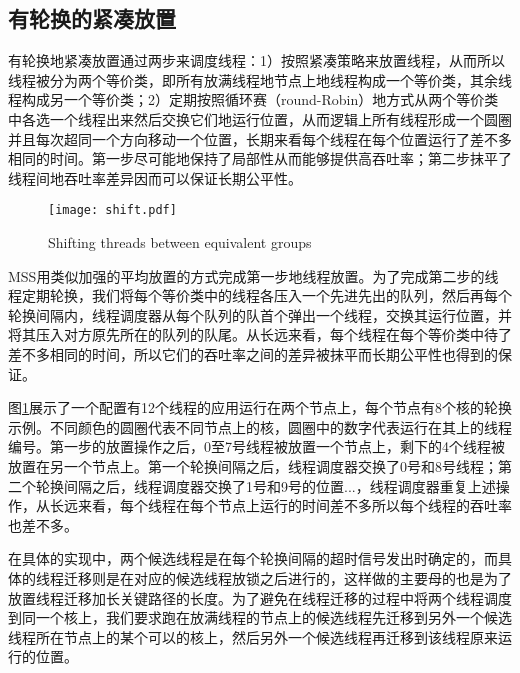 \subsection{有轮换的紧凑放置}
有轮换地紧凑放置通过两步来调度线程：1）按照紧凑策略来放置线程，从而所以线程被分为两个等价类，即所有放满线程地节点上地线程构成一个等价类，其余线程构成另一个等价类；2）定期按照循环赛（round-Robin）地方式从两个等价类中各选一个线程出来然后交换它们地运行位置，从而逻辑上所有线程形成一个圆圈并且每次超同一个方向移动一个位置，长期来看每个线程在每个位置运行了差不多相同的时间。第一步尽可能地保持了局部性从而能够提供高吞吐率；第二步抹平了线程间地吞吐率差异因而可以保证长期公平性。
\begin{figure}[t]
	\centering
	\texttt{[image: shift.pdf]}
	\caption{Shifting threads between equivalent groups}
	\label{Fig:shift}
\end{figure}

MSS用类似加强的平均放置的方式完成第一步地线程放置。为了完成第二步的线程定期轮换，我们将每个等价类中的线程各压入一个先进先出的队列，然后再每个轮换间隔内，线程调度器从每个队列的队首个弹出一个线程，交换其运行位置，并将其压入对方原先所在的队列的队尾。从长远来看，每个线程在每个等价类中待了差不多相同的时间，所以它们的吞吐率之间的差异被抹平而长期公平性也得到的保证。

图\ref{Fig:shift}展示了一个配置有12个线程的应用运行在两个节点上，每个节点有8个核的轮换示例。不同颜色的圆圈代表不同节点上的核，圆圈中的数字代表运行在其上的线程编号。第一步的放置操作之后，0至7号线程被放置一个节点上，剩下的4个线程被放置在另一个节点上。第一个轮换间隔之后，线程调度器交换了0号和8号线程；第二个轮换间隔之后，线程调度器交换了1号和9号的位置...，线程调度器重复上述操作，从长远来看，每个线程在每个节点上运行的时间差不多所以每个线程的吞吐率也差不多。

在具体的实现中，两个候选线程是在每个轮换间隔的超时信号发出时确定的，而具体的线程迁移则是在对应的候选线程放锁之后进行的，这样做的主要母的也是为了放置线程迁移加长关键路径的长度。为了避免在线程迁移的过程中将两个线程调度到同一个核上，我们要求跑在放满线程的节点上的候选线程先迁移到另外一个候选线程所在节点上的某个可以的核上，然后另外一个候选线程再迁移到该线程原来运行的位置。